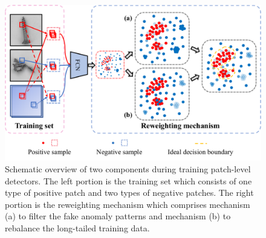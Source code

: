 \documentclass[letterpaper]{article} %
\begin{document}
\begin{figure}[!t]
\centering
    \includegraphics[width=1\linewidth]{images/training_detector.pdf}
    \vspace{-0.6cm}
    \caption{Schematic overview of two components during training patch-level detectors. The left portion is the training set which consists of one type of positive patch and two types of negative patches. The right portion is the reweighting mechanism which comprises mechanism (a) to filter the fake anomaly patterns and mechanism (b) to rebalance the long-tailed training data.}
    \label{fig: detector}
    \vspace{-0.4cm}
\end{figure}
\end{document}
